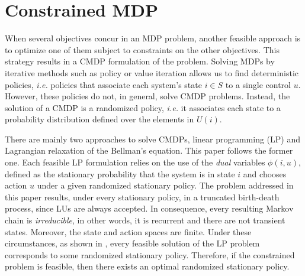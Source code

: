 \section{Constrained MDP}\label{sec:Constrained MDP}
When several objectives concur in an MDP problem, another feasible approach is to optimize one of them subject to constraints on the other objectives. This strategy results in a CMDP formulation of the problem. Solving MDPs by iterative methods such as policy or value iteration allows us to find deterministic policies, \textit{i.e.} policies that associate each system's state $i \in S$ to a single control $u$.
However, these policies do not, in general, solve CMDP problems. Instead, the solution of a CMDP is a randomized policy, \textit{i.e.} it associates each state to a probability distribution defined over the elements in $U(i)$.

There are mainly two approaches to solve CMDPs, linear programming (LP) and Lagrangian relaxation of the Bellman's equation. This paper follows the former one. Each feasible LP formulation relies on the use of the \textit{dual} variables $\phi\left(i,u\right)$, defined as the stationary probability that the system is in state $i$ and chooses action $u$ under a given randomized stationary policy. The problem addressed in this paper results, under every stationary policy, in a truncated birth-death process, since LUs are always accepted. In consequence, every resulting Markov chain is \textit{irreducible}, in other words, it is recurrent and there are not transient states. Moreover, the state and action spaces are finite.
Under these circumstances, as shown in \cite{ref:Puterman}, every feasible solution of the LP problem corresponds to some randomized stationary policy. Therefore, if the constrained problem is feasible, then there exists an optimal randomized stationary policy.

